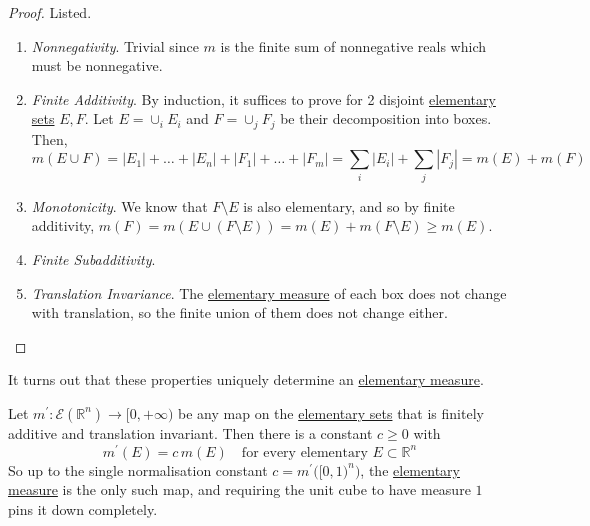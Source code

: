 	\begin{proof}
	  Listed. 
		\begin{enumerate}
		  \item \textit{Nonnegativity}. Trivial since $m$ is the finite sum of nonnegative reals which must be nonnegative. 
			\item \textit{Finite Additivity}. By induction, it suffices to prove for 2 disjoint \hyperref[def:elementary-set]{elementary sets} $E, F$. Let $E = \cup_i E_i$ and $F = \cup_j F_j$ be their decomposition into boxes. Then, 
				\begin{equation}
					m(E \cup F) = |E_1| + \ldots + |E_n| + |F_1| + \ldots + |F_m| = \sum_i |E_i| + \sum_j |F_j| = m(E) + m(F)
				\end{equation}

			\item \textit{Monotonicity}. We know that $F \setminus E$ is also elementary, and so by finite additivity, $m(F) = m(E \cup (F \setminus E)) = m(E) + m(F \setminus E) \geq m(E)$. 

			\item \textit{Finite Subadditivity}. 

			\item \textit{Translation Invariance}. The \hyperref[def:elementary-measure]{elementary measure} of each box does not change with translation, so the finite union of them does not change either. 
		\end{enumerate}
	\end{proof}

  It turns out that these properties uniquely determine an \hyperref[def:elementary-measure]{elementary measure}. 

  \begin{theorem}
    \label{thm:uniqueness-of-elementary-measure}
    Let $m^\prime: \mathcal{E}(\mathbb{R}^n) \to [0, +\infty)$ be any map on the \hyperref[def:elementary-set]{elementary sets} that is finitely additive and translation invariant. Then there is a constant $c \geq 0$ with
    \begin{equation}
      m^\prime (E) = c \, m(E) \quad \text{for every elementary } E \subset \mathbb{R}^n
    \end{equation}
    So up to the single normalisation constant $c = m^\prime \big( [0,1)^n \big)$, the \hyperref[def:elementary-measure]{elementary measure} is the only such map, and requiring the unit cube to have measure $1$ pins it down completely. 
  \end{theorem}

